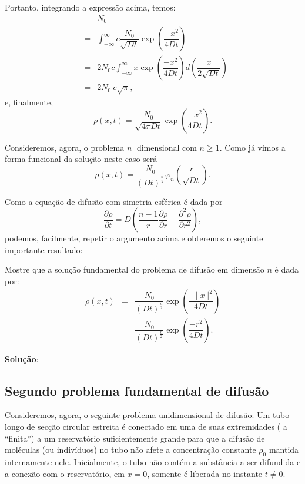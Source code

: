 \begin{enumerate}
    Portanto, integrando a expressão acima, temos:
    \[\begin{array}{rcl}
    & & N_{0} \\
    &=& \displaystyle\int_{-\infty}^{\infty} c \dfrac{N_{0}}{\sqrt{Dt}} \exp\left(\dfrac{-x^2}{4Dt}\right) \\[0.4cm]
    &=& 2N_{0} c \displaystyle\int_{-\infty}^{\infty} x \exp\left(\dfrac{-x^2}{4Dt}\right) d\left(\dfrac{x}{2\sqrt{Dt}}\right) \\[0.4cm]
    &=& 2N_{0} \ c \sqrt{\pi},
    \end{array}\]
    e, finalmente,
    \[\rho(x, t) = \dfrac{N_{0}}{\sqrt{4\pi Dt}} \exp\left(\dfrac{-x^2}{4Dt}\right).\]

    Consideremos, agora, o problema \(n\) dimensional com \(n \ge 1\). Como já vimos a forma funcional da solução neste caso será
    \[\rho(x, t) = \dfrac{N_{0}}{(Dt)^{\frac{n}{2}}} \varphi_n\left(\dfrac{r}{\sqrt{Dt}}\right).\]

    Como a equação de difusão com simetria esférica é dada por
    \[\dfrac{\partial \rho}{\partial t} = D \left(\dfrac{n-1}{r} \dfrac{\partial \rho}{\partial r} + \dfrac{\partial^2 \rho}{\partial r^2}\right),\]
    podemos, facilmente, repetir o argumento acima e obteremos o seguinte importante resultado:
\end{enumerate}

\begin{exercise}
    Mostre que a solução fundamental do problema de difusão em dimensão \(n\) é dada por:
    \[\begin{array}{rcl}
    \rho(x, t)
    &=& \dfrac{N_{0}}{(Dt)^{\frac{n}{2}}} \exp\left(\dfrac{-||x||^2}{4Dt}\right) \\[0.4cm]
    &=& \dfrac{N_{0}}{(Dt)^{\frac{n}{2}}} \exp\left(\dfrac{-r^2}{4Dt}\right).
    \end{array}\]
\end{exercise}

    \textbf{Solução}:



\subsection{Segundo problema fundamental de difusão}

    Consideremos, agora, o seguinte problema unidimensional de difusão: Um tubo longo de secção circular estreita é conectado em uma de suas extremidades ( a ``finita'') a um reservatório suficientemente grande para que a difusão de moléculas (ou indivíduos) no tubo não afete a concentração constante \(\rho_0\) mantida internamente nele. Inicialmente, o tubo não contém a substância a ser difundida e a conexão com o reservatório, em \(x = 0\), somente é liberada no instante \(t \ne 0\).
    
